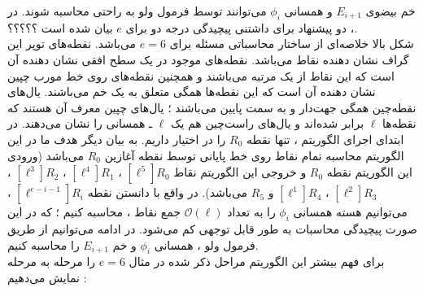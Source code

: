 \documentclass[12pt,a4paper]{article}
\begin{document}
 خم بیضوی 
$E_{i+1}$
و همسانی
$\phi_i$
می‌توانند توسط فرمول ولو 
\cite{velu}
به راحتی محاسبه شوند.
در 
\cite{jao2011towards}
، دو پیشنهاد برای داشتنی پیچیدگی درجه دو برای 
$e$
بیان شده است  ؟؟؟؟؟.
\\
شکل بالا خلاصه‌ای از ساختار محاسباتی مسئله برای 
$e = 6$
می‌باشد. نقطه‌های توپر این گراف نشان دهنده نقاط می‌باشد. نقطه‌های موجود در یک سطح افقی نشان دهنده آن است که این نقاط از یک مرتبه می‌باشند و همچنین نقطه‌های روی خط مورب چپین نشان دهنده آن است که این نقطه‌ها همگی متعلق به یک خم می‌باشند. یال‌های نقطه‌چین همگی جهت‌دار و به سمت پایین می‌باشند ؛ یال‌های چپین معرف آن هستند که نقطه‌ها 
$\ell$
برابر شده‌اند و یال‌های راست‌چین هم یک 
$\ell$
ـ همسانی را نشان می‌دهند.
در ابتدای اجرای الگوریتم ، تنها نقطه 
$R_0$
را در اختیار داریم. به بیان دیگر هدف ما در این الگوریتم  محاسبه تمام نقاط روی خط پایانی توسط نقطه آغازین 
$R_0$
می‌باشد (ورودی این الگوریتم نقطه 
$R_0$
و خروجی این الگوریتم نقاط 
$[\ell^5]R_0$
،
$[\ell^4]R_1$
،
$[\ell^3]R_2$
،
$[\ell^2]R_3$
،
$[\ell^1]R_4$
و
$R_5$
می‌باشد).
در واقع با دانستن نقطه 
$[\ell^{e-i-1}]R_i$
، می‌توانیم هسته همسانی
$\phi_i$
را به تعداد
$\mathcal{O}(\ell)$
جمع نقاط ، محاسبه کنیم ؛ که در این صورت پیچیدگی محاسبات به طور قابل توجهی کم می‌شود. در ادامه می‌توانیم از طریق فرمول ولو ، همسانی 
$\phi_i$
و خم 
$E_{i+1}$
را محاسبه کنیم. 
\\
برای فهم بیشتر این الگوریتم مراحل ذکر شده در مثال 
$e=6$
را مرحله به مرحله نمایش می‌دهیم :
\end{document}
